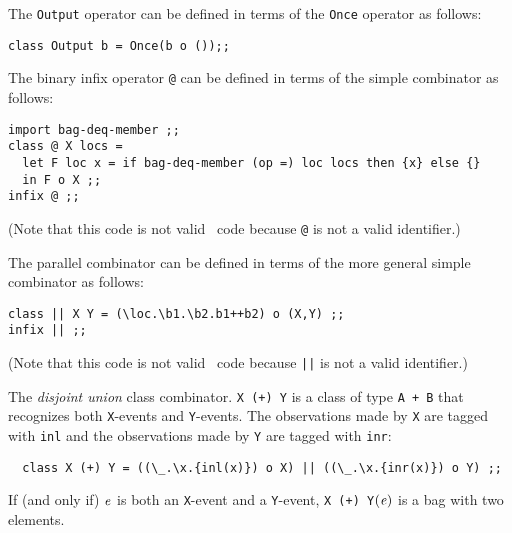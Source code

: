 \documentclass[final]{article}
\begin{document}

The \lstinline{Output} operator can be defined in terms of the
\lstinline{Once} operator as follows:
\begin{emlcode}
\begin{lstlisting}
class Output b = Once(b o ());;
\end{lstlisting}
\end{emlcode}



The binary infix operator \lstinline{@} can be defined in terms of the
simple combinator as follows:
\begin{emlcode}
\begin{lstlisting}
import bag-deq-member ;;
class @ X locs =
  let F loc x = if bag-deq-member (op =) loc locs then {x} else {}
  in F o X ;;
infix @ ;;
\end{lstlisting}
\end{emlcode}
(Note that this code is not valid \eml\ code because \lstinline{@} is
not a valid identifier.)



The parallel combinator can be defined in terms of the more general
simple combinator as follows:
\begin{emlcode}
\begin{lstlisting}
class || X Y = (\loc.\b1.\b2.b1++b2) o (X,Y) ;;
infix || ;;
\end{lstlisting}
\end{emlcode}
(Note that this code is not valid \eml\ code because \lstinline{||} is
not a valid identifier.)


The \emph{disjoint union}%
%
%
%
class combinator.
%
\lstinline{X (+) Y} is a class of type \lstinline{A + B} that
recognizes both \lstinline{X}-events and \lstinline{Y}-events.  The
observations made by \lstinline{X} are tagged with \lstinline{inl} and
the observations made by \lstinline{Y} are tagged with \lstinline{inr}:
\begin{emlcode}
\begin{lstlisting}
  class X (+) Y = ((\_.\x.{inl(x)}) o X) || ((\_.\x.{inr(x)}) o Y) ;;
\end{lstlisting}
\end{emlcode}
If (and only if) $\mathit{e}$ is both an \lstinline{X}-event and a
\lstinline{Y}-event, \lstinline{X (+) Y}$(\mathit{e})$ is a bag with
two elements.
\end{document}
